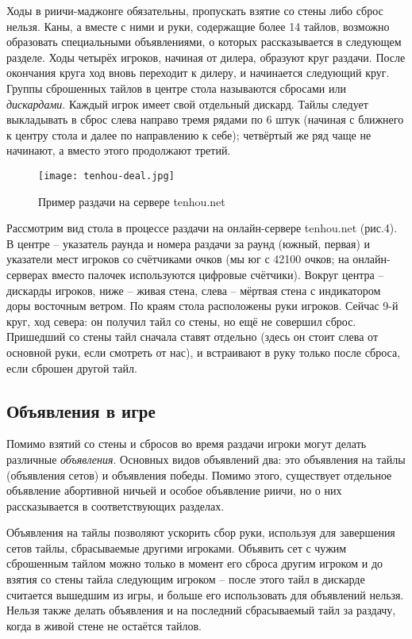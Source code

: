 Ходы в риичи-маджонге обязательны, пропускать взятие со стены либо сброс нельзя. Каны, а вместе с ними и руки, содержащие более 14 тайлов, возможно образовать специальными объявлениями, о которых рассказывается в следующем разделе. Ходы четырёх игроков, начиная от дилера, образуют круг раздачи. После окончания круга ход вновь переходит к дилеру, и начинается следующий круг. Группы сброшенных тайлов в центре стола называются сбросами или \textit{дискардами}. Каждый игрок имеет свой отдельный дискард. Тайлы следует выкладывать в сброс слева направо тремя рядами по 6 штук (начиная с ближнего к центру стола и далее по направлению к себе); четвёртый же ряд чаще не начинают, а вместо этого продолжают третий.

\begin{figure}[H]
	\centering
	\texttt{[image: tenhou-deal.jpg]}
	\caption{Пример раздачи на сервере tenhou.net}
\end{figure}

Рассмотрим вид стола в процессе раздачи на онлайн-сервере tenhou.net (рис.4). В центре – указатель раунда и номера раздачи за раунд (южный, первая) и указатели мест игроков со счётчиками очков (мы юг с 42100 очков; на онлайн-серверах вместо палочек используются цифровые счётчики). Вокруг центра – дискарды игроков, ниже – живая стена, слева – мёртвая стена с индикатором доры восточным ветром. По краям стола расположены руки игроков. Сейчас 9-й круг, ход севера: он получил тайл со стены, но ещё не совершил сброс. Пришедший со стены тайл сначала ставят отдельно (здесь он стоит слева от основной руки, если смотреть от нас), и встраивают в руку только после сброса, если сброшен другой тайл.

\subsection{Объявления в игре}

Помимо взятий со стены и сбросов во время раздачи игроки могут делать различные \textit{объявления}. Основных видов объявлений два: это объявления на тайлы (объявления сетов) и объявления победы. Помимо этого, существует отдельное объявление абортивной ничьей и особое объявление риичи, но о них рассказывается в соответствующих разделах.

Объявления на тайлы позволяют ускорить сбор руки, используя для завершения сетов тайлы, сбрасываемые другими игроками. Объявить сет с чужим сброшенным тайлом можно только в момент его сброса другим игроком и до взятия со стены тайла следующим игроком – после этого тайл в дискарде считается вышедшим из игры, и больше его использовать для объявлений нельзя. Нельзя также делать объявления и на последний сбрасываемый тайл за раздачу, когда в живой стене не остаётся тайлов. 

